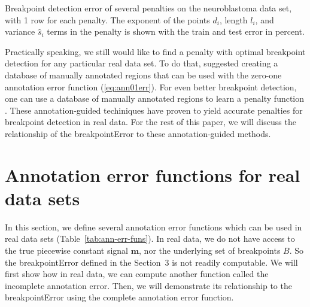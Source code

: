 \documentclass{jsfds} %
\newcommand{\tab}[3][H]{
  \begin{table}[#1]
    \begin{center}
          
    \end{center}
    \caption{#3}
    \label{tab:#2}
  \end{table}
}
\begin{document}
\tab{penalty-real-data}{Breakpoint detection error of several penalties on the
  neuroblastoma data set, with 1 row for each penalty. The exponent of
  the points $d_i$, length $l_i$, and variance $\hat s_i$ terms in the
  penalty is shown with the train and test error in percent. }

Practically speaking, we still would like to find a penalty with
optimal breakpoint detection for any particular real data set. To do
that, \citet{HOCKING-breakpoints} suggested creating a database of
manually annotated regions that can be used with the zero-one
annotation error function (\ref{eq:ann01err}). For even better
breakpoint detection, one can use a database of manually annotated
regions to learn a penalty function \citep{HOCKING-penalties}. These
annotation-guided techiniques have proven to yield accurate penalties
for breakpoint detection in real data. For the rest of this paper, we
will discuss the relationship of the breakpointError to these
annotation-guided methods.






\newpage

\section{Annotation error functions for real data sets}
\label{sec:relaxation}

In this section, we define several annotation error functions which
can be used in real data sets (Table~\ref{tab:ann-err-funs}).  In real
data, we do not have access to the true piecewise constant signal
$\mathbf m$, nor the underlying set of breakpoints $B$. So the
breakpointError defined in the Section~3 is not readily
computable. We will first show how in real data, we can compute
another function called the incomplete annotation error. Then, we will
demonstrate its relationship to the breakpointError using the complete
annotation error function.
\end{document}
